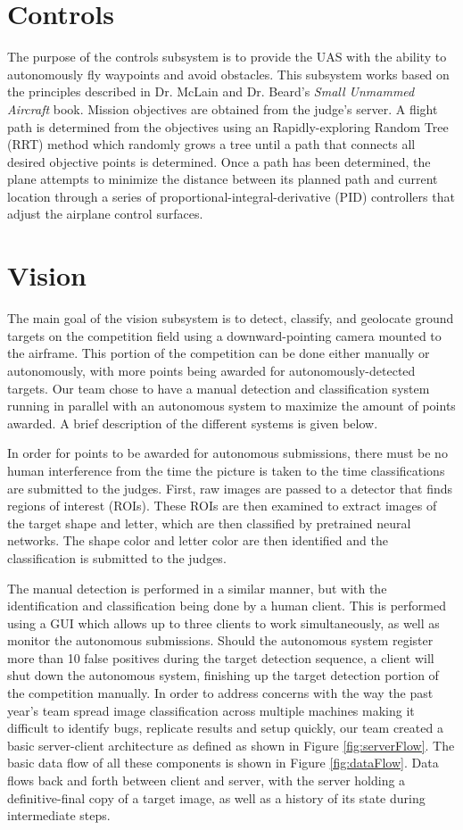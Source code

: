 \documentclass[]{auvsi_doc}
\begin{document}
\section{Controls}
The purpose of the controls subsystem is to provide the UAS with the ability to autonomously fly waypoints and avoid obstacles.
This subsystem works based on the principles described in Dr. McLain and Dr. Beard's \textit{Small Unmammed Aircraft} book.
Mission objectives are obtained from the judge's server.
A flight path is determined from the objectives using an Rapidly-exploring Random Tree (RRT) method which randomly grows a tree until a path that connects all desired objective points is determined.
Once a path has been determined, the plane attempts to minimize the distance between its planned path and current location through a series of proportional-integral-derivative (PID) controllers that adjust the airplane control surfaces.


\section{Vision}
The main goal of the vision subsystem is to detect, classify, and geolocate ground targets on the competition field using a downward-pointing camera mounted to the airframe. 
This portion of the competition can be done either manually or autonomously, with more points being awarded for autonomously-detected targets.
Our team chose to have a manual detection and classification system running in parallel with an autonomous system to maximize the amount of points awarded. A brief description of the different systems is given below.

In order for points to be awarded for autonomous submissions, there must be no human interference from the time the picture is taken to the time classifications are submitted to the judges. First, raw images are passed to a detector that finds regions of interest (ROIs). These ROIs are then examined to extract images of the target shape and letter, which are then classified by pretrained neural networks. The shape color and letter color are then identified and the classification is submitted to the judges.

The manual detection is performed in a similar manner, but with the identification and classification being done by a human client. This is performed using a GUI which allows up to three clients to work simultaneously, as well as monitor the autonomous submissions. Should the autonomous system register more than 10 false positives during the target detection sequence, a client will shut down the autonomous system, finishing up the target detection portion of the competition manually.
In order to address concerns with the way the past year's team spread image classification
across multiple machines making it difficult to identify bugs, replicate
results and setup quickly, our team created a
basic server-client architecture as defined as shown in Figure \ref{fig:serverFlow}.
The basic data flow of all these components is shown in Figure \ref{fig:dataFlow}.
Data flows back and forth between client and server, with the server holding a definitive-final
copy of a target image, as well as a history of its state during intermediate steps.
\end{document}
